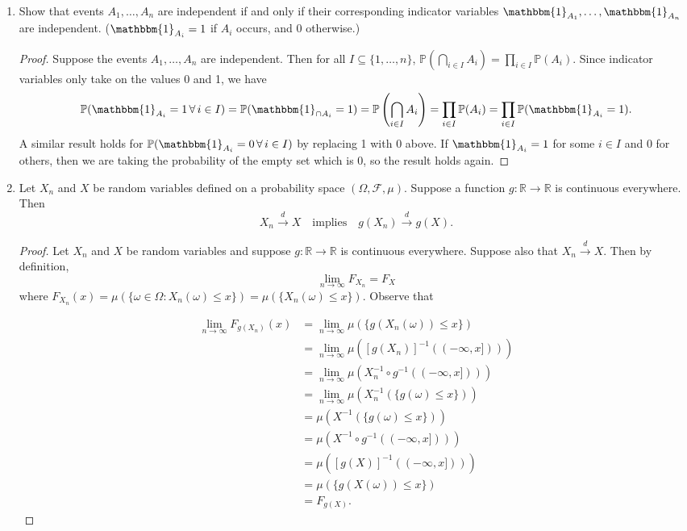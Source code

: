 \documentclass[11pt,oneside,english]{amsart}
\theoremstyle{definition}
\newcommand{\lspace}{\vspace{5mm}}
\newcommand{\MC}[1]{\mathcal{#1}}
\newcommand{\MB}[1]{\mathbb{#1}}
\newcommand{\1}{\mathbbm{1}}
\newcommand{\p}{\mathbb{P}}
\begin{document}
\rightline{\today}

\lspace




\begin{enumerate}[leftmargin=*]
\itemsep5mm


\item Show that events $A_1,\ldots, A_n$ are independent if and only if their corresponding indicator variables $\1_{A_1},\ldots,\1_{A_n}$ are independent. ($\1_{A_i}=1$ if $A_i$ occurs, and 0 otherwise.)

\begin{proof}
Suppose the events $A_1,\ldots, A_n$ are independent. Then for all $I\subseteq\{1,\ldots,n\}$, $\p\left(\bigcap_{i\in I}A_i\right)=\prod_{i\in I}\p(A_i)$. Since indicator variables only take on the values 0 and 1, we have
\[
\p(\1_{A_i}=1\, \forall \,i\in I)=\p(\1_{\cap A_i}=1)=\p\left(\bigcap_{i\in I}A_i\right)=\prod_{i\in I}\p(A_i)=\prod_{i\in I}\p(\1_{A_i}=1).
\]
A similar result holds for $\p(\1_{A_i}=0\, \forall \,i\in I)$ by replacing 1 with 0 above. If $\1_{A_i}=1$ for some $i\in I$ and 0 for others, then we are taking the probability of the empty set which is 0, so the result holds again.\end{proof}




\pagebreak








\item Let $X_n$ and $X$ be random variables defined on a probability space $(\Omega,\MC{F},\mu)$. Suppose a function $g:\MB{R}\to\MB{R}$ is continuous everywhere. Then
\[
X_n \xrightarrow{d} X \quad\text{implies}\quad g(X_n)\xrightarrow{d} g(X).
\]

\begin{proof}
Let $X_n$ and $X$ be random variables and suppose $g:\MB{R}\to\MB{R}$ is continuous everywhere. Suppose also that $X_n \xrightarrow{d} X$. Then by definition,
\[
\lim_{n\to\infty}F_{X_n}=F_X
\]
where $F_{X_n}(x)=\mu(\{\omega\in \Omega:X_n(\omega)\leq  x\})=\mu(\{X_n(\omega)\leq  x\})$. Observe that

\begin{align*}
\lim_{n\to\infty} F_{g(X_n)}(x)&=\lim_{n\to\infty}\mu(\{g(X_n(\omega))\leq x\})\\[2mm]
&=\lim_{n\to\infty}\mu\left([g(X_n)]^{-1}((-\infty,x]))\right)\\[2mm]
&=\lim_{n\to\infty}\mu\left(X_n^{-1}\circ g^{-1}((-\infty,x]))\right)\\[2mm]
&=\lim_{n\to\infty}\mu\left(X_n^{-1}(\{g(\omega)\leq x\})\right)\\[2mm]
&=\mu\left(X^{-1}(\{g(\omega)\leq x\})\right)\\[2mm]
&=\mu\left(X^{-1}\circ g^{-1}((-\infty,x]))\right)\\[2mm]
&=\mu\left([g(X)]^{-1}((-\infty,x]))\right)\\[2mm]
&=\mu(\{g(X(\omega))\leq x\})\\[2mm]
&=F_{g(X)}.
\end{align*}


\end{proof}
\end{enumerate}
\end{document}
